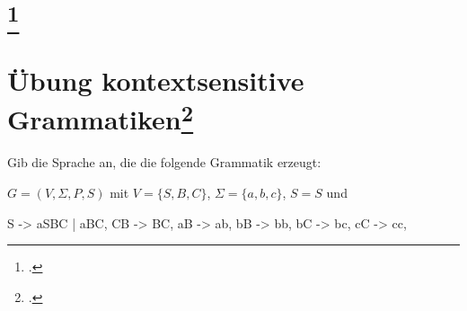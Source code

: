 \documentclass{lehramt-informatik-aufgabe}
\begin{document}
\section{
\footcite{theo:fs:3}}

\section{Übung kontextsensitive Grammatiken\footcite[Seite 8]{theo:fs:3}}

Gib die Sprache an, die die folgende Grammatik erzeugt:

$G = (V, \Sigma, P, S)$ mit
$V = \{S, B, C\}$, $\Sigma = \{a, b, c\}$,
$S=S$ und

\begin{liProduktionsRegeln}
S -> aSBC | aBC,
CB -> BC,
aB -> ab,
bB -> bb,
bC -> bc,
cC -> cc,
\end{liProduktionsRegeln}
\end{document}
